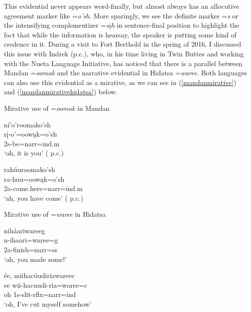 This evidential never appears word-finally, but almost always has an allocutive agreement marker like =\textit{o'sh}. More sparingly, we see the definite marker =\textit{s} or the intensifying complementizer =\textit{sįh} in sentence-final position to highlight the fact that while the information is hearsay, the speaker is putting some kind of credence in it. During a visit to Fort Berthold in the spring of 2016, I discussed this issue with Indrek \citeauthor{park2012} (p.c.), who, in his time living in Twin Buttes and working with the Nueta Language Initiative, has noticed that there is  a parallel between Mandan =\textit{oomak} and the narrative evidential in Hidatsa =\textit{waree}. Both languages can also use this evidential as a mirative, as we can see in (\ref{mandanmirative}) and (\ref{mandanmirativehidatsa}) below.


\begin{exe}

\item\label{mandanmirative} Mirative use of =\textit{oomak} in Mandan

	\begin{xlist}
	
	\item\label{mandanmirative1}
	\glll ní'o'roomako'sh\\
	rį-o'=oowąk=o'sh\\
	2s-\textnormal{be}=narr=ind.m\\
	\glt `oh, it is you' (\citeauthor{park2012} p.c.)
	
	\item\label{mandanmirative2}
	\glll rahúuroomako'sh\\
	ra-huu=oowąk=o'sh\\
	2a-\textnormal{come.here}=narr=ind.m\\
	\glt `ah, you have come' (\citeauthor{park2012} p.c.)	
	
	\end{xlist}

\item\label{mandanmirativehidatsa} Mirative use of =\textit{waree} in Hidatsa

	\begin{xlist}
	
	\item\label{mandanmirativehidatsa1}
	\glll niháariwareeg\\
		n-ihaari=waree=g\\
		2a-\textnormal{finish}=narr=ss\\
		\glt `oh, you made some!' \citep[256]{park2012}

	\item\label{mandanmirativehidatsa2}
	\glll	 ée, miihacúudiriawareec\\
		ee wii-hacuudi-ria=waree=c\\
		\textnormal{oh} 1s-\textnormal{slit}-rflx=narr=ind\\
		\glt `oh, I've cut myself somehow' \citep[256]{park2012}
	
	\end{xlist}
	
\end{exe}

